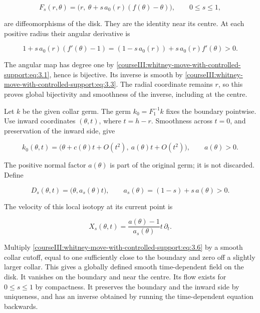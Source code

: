 \begin{equation}
F_s(r,\theta)=
\bigl(r,\ \theta+s\,a_0(r)(f(\theta)-\theta)\bigr),
\qquad 0\leq s\leq1,
\label{courseIII:whitney-move-with-controlled-support:eq:3.2}
\end{equation}

are diffeomorphisms of the disk. They are the identity near its centre. At each positive radius their angular derivative is

\begin{equation}
1+s\,a_0(r)(f'(\theta)-1)
=(1-s\,a_0(r))+s\,a_0(r)f'(\theta)>0.
\label{courseIII:whitney-move-with-controlled-support:eq:3.3}
\end{equation}

The angular map has degree one by \eqref{courseIII:whitney-move-with-controlled-support:eq:3.1}, hence is bijective. Its inverse is smooth by \eqref{courseIII:whitney-move-with-controlled-support:eq:3.3}. The radial coordinate remains \(r\), so this proves global bijectivity and smoothness of the inverse, including at the centre.

Let \(k\) be the given collar germ. The germ \(k_0=F_1^{-1}k\) fixes the boundary pointwise. Use inward coordinates \((\theta,t)\), where \(t=h-r\). Smoothness across \(t=0\), and preservation of the inward side, give

\begin{equation}
k_0(\theta,t)=
\bigl(\theta+c(\theta)t+O(t^2),\
       a(\theta)t+O(t^2)\bigr),\qquad a(\theta)>0.
\label{courseIII:whitney-move-with-controlled-support:eq:3.4}
\end{equation}

The positive normal factor \(a(\theta)\) is part of the original germ; it is not discarded. Define

\begin{equation}
D_s(\theta,t)=\bigl(\theta,a_s(\theta)t\bigr),\qquad
a_s(\theta)=(1-s)+s\,a(\theta)>0.
\label{courseIII:whitney-move-with-controlled-support:eq:3.5}
\end{equation}

The velocity of this local isotopy at its current point is

\begin{equation}
X_s(\theta,t)=\frac{a(\theta)-1}{a_s(\theta)}
                  t\,\partial_t.
\label{courseIII:whitney-move-with-controlled-support:eq:3.6}
\end{equation}

Multiply \eqref{courseIII:whitney-move-with-controlled-support:eq:3.6} by a smooth collar cutoff, equal to one sufficiently close to the boundary and zero off a slightly larger collar. This gives a globally defined smooth time-dependent field on the disk. It vanishes on the boundary and near the centre. Its flow exists for \(0\leq s\leq1\) by compactness. It preserves the boundary and the inward side by uniqueness, and has an inverse obtained by running the time-dependent equation backwards.

